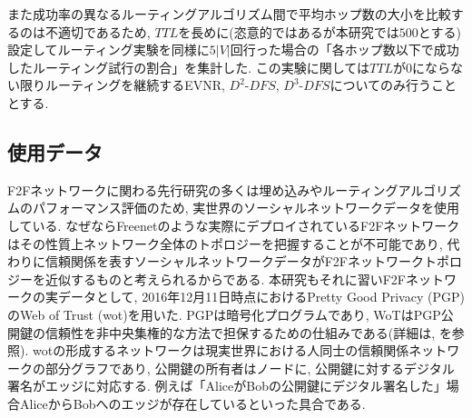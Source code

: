 \documentclass[dvipdfmx]{ampbt}
\begin{document}
  また成功率の異なるルーティングアルゴリズム間で平均ホップ数の大小を比較するのは不適切であるため, $TTL$を長めに(恣意的ではあるが本研究では$500$とする)設定してルーティング実験を同様に$5|V|$回行った場合の「各ホップ数以下で成功したルーティング試行の割合」を集計した. この実験に関しては$TTL$が0にならない限りルーティングを継続するEVNR, $D^2$-$DFS$, $D^3$-$DFS$についてのみ行うこととする. 

  \subsection{使用データ} \label{sec:wot}
  F2Fネットワークに関わる先行研究の多くは埋め込みやルーティングアルゴリズムのパフォーマンス評価のため, 実世界のソーシャルネットワークデータを使用している. なぜならFreenetのような実際にデプロイされているF2Fネットワークはその性質上ネットワーク全体のトポロジーを把握することが不可能であり, 代わりに信頼関係を表すソーシャルネットワークデータがF2Fネットワークトポロジーを近似するものと考えられるからである. 本研究もそれに習いF2Fネットワークの実データとして, 2016年12月11日時点におけるPretty Good Privacy (PGP)のWeb of Trust (\acrshort{wot})を用いた. PGPは暗号化プログラムであり, WoTはPGP公開鍵の信頼性を非中央集権的な方法で担保するための仕組みである(詳細は\cite{zimmermann1995official}, \cite{abdul1998distributed}を参照). \acrshort{wot}の形成するネットワークは現実世界における人同士の信頼関係ネットワークの部分グラフであり, 公開鍵の所有者はノードに, 公開鍵に対するデジタル署名がエッジに対応する. 例えば「AliceがBobの公開鍵にデジタル署名した」場合AliceからBobへのエッジが存在しているといった具合である.
\end{document}
